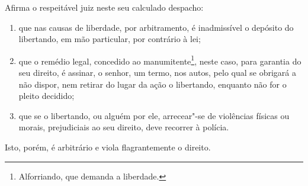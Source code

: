 Afirma o respeitável juiz neste seu calculado despacho:

\begin{enumerate}[label=\arabic*º]
\item que nas causas de liberdade, por arbitramento, é inadmissível
o depósito do libertando, em mão particular, por contrário à lei;

\item que o remédio legal, concedido ao manumitente\footnote{
  Alforriando, que demanda a liberdade.}, neste caso, para garantia do
seu direito, é assinar, o senhor, um termo, nos autos, pelo qual se
obrigará a não dispor, nem retirar do lugar da ação o libertando,
enquanto não for o pleito decidido;

\item que se o libertando, ou alguém por ele, arrecear"-se de
violências físicas ou morais, prejudiciais ao seu direito, deve recorrer
à polícia.
\end{enumerate}

Isto, porém, é arbitrário e viola flagrantemente o direito.

